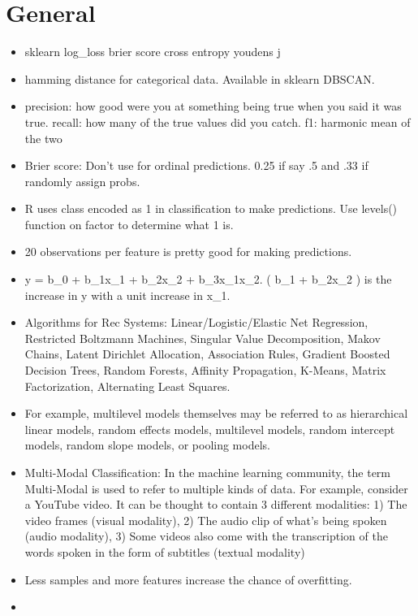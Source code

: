 \documentclass[]{book}
\begin{document}
\section{General}\label{general-2}

\begin{itemize}
\item
  sklearn log\_loss \textbar{} brier score\textbar{} cross entropy
  \textbar{} youdens j
\item
  hamming distance for categorical data. Available in sklearn DBSCAN.
\item
  precision: how good were you at something being true when you said it
  was true. recall: how many of the true values did you catch. f1:
  harmonic mean of the two
\item
  Brier score: Don't use for ordinal predictions. 0.25 if say .5 and .33
  if randomly assign probs.
\item
  R uses class encoded as 1 in classification to make predictions. Use
  levels() function on factor to determine what 1 is.
\item
  20 observations per feature is pretty good for making predictions.
\item
  y = b\_0 + b\_1x\_1 + b\_2x\_2 + b\_3x\_1x\_2. ( b\_1 + b\_2x\_2 ) is
  the increase in y with a unit increase in x\_1.
\item
  Algorithms for Rec Systems: Linear/Logistic/Elastic Net Regression,
  Restricted Boltzmann Machines, Singular Value Decomposition, Makov
  Chains, Latent Dirichlet Allocation, Association Rules, Gradient
  Boosted Decision Trees, Random Forests, Affinity Propagation, K-Means,
  Matrix Factorization, Alternating Least Squares.
\item
  For example, multilevel models themselves may be referred to as
  hierarchical linear models, random effects models, multilevel models,
  random intercept models, random slope models, or pooling models.
\item
  Multi-Modal Classification: In the machine learning community, the
  term Multi-Modal is used to refer to multiple kinds of data. For
  example, consider a YouTube video. It can be thought to contain 3
  different modalities: 1) The video frames (visual modality), 2) The
  audio clip of what's being spoken (audio modality), 3) Some videos
  also come with the transcription of the words spoken in the form of
  subtitles (textual modality)
\item
  Less samples and more features increase the chance of overfitting.
\item

\end{itemize}
\end{document}
